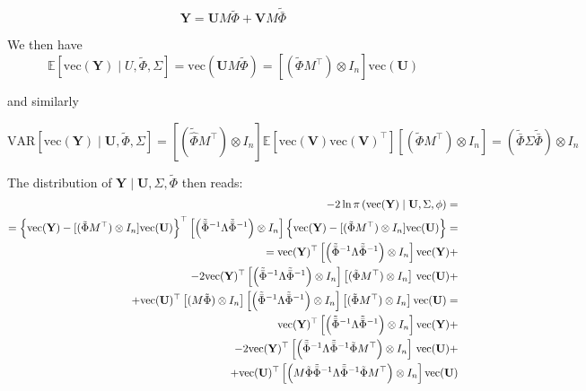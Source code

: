 \documentclass[
]{article}
\begin{document}
\begin{equation}
\label{eq:Mmod_conv}
\mathbf{Y} =     \mathbf{U}M\tilde{\Phi} + \mathbf{V}M \tilde{\bar{\Phi}}
\end{equation}

We then have \[
\mathbb{E} [\mathrm{vec}(\mathbf{Y}) \mid U, \tilde{\Phi}, \Sigma] = \mathrm{vec}(\mathbf{U} M \tilde{\Phi}) =
[(\tilde{\Phi} M^{\top}) \otimes I_n] \mathrm{vec}(\mathbf{U})
\]

and similarly

\[
\mathrm{VAR} [\mathrm{vec}(\mathbf{Y}) \mid \mathbf{U}, \tilde{\Phi}, \Sigma] =
\left[(\tilde{{\hat\Phi}} M^{\top}) \otimes I_n \right] 
\mathbb{E} \left[
\mathrm{vec}(\mathbf{V})
\mathrm{vec}(\mathbf{V})^\top \right]
\left[(\tilde{\Phi} M^{\top}) \otimes I_n \right] = 
\left(
\tilde{\bar{\Phi}} \Sigma \tilde{\bar{\Phi}}
\right) \otimes I_n
\]

The distribution of \(\mathbf{Y} \mid \mathbf{U}, \Sigma, \tilde{\Phi}\)
then reads: \begin{align*}
-2 \ln \pi \left(\mathrm{vec}(\mathbf{Y}) \mid \mathbf{U}, \Sigma, \phi \right) = \\= \Big{ \{ }
 \mathrm{vec}(\mathbf{Y}) - [(\tilde{\Phi} M^{\top}) \otimes I_n] \mathrm{vec}(\mathbf{U}) \Big{\} } ^{\top}
\left[ \left(
\tilde{\bar{\Phi}}^{-1} \Lambda \tilde{\bar{\Phi}}^{-1}
\right) \otimes I_n \right] 
\Big{ \{ } \mathrm{vec}(\mathbf{Y}) -[(\tilde{\Phi} M^{\top}) \otimes I_n] \mathrm{vec}(\mathbf{U}) \Big{\}} = \\ =
\mathrm{vec}(\mathbf{Y})^{\top}
\left[ \left(
\tilde{\bar{\Phi}}^{-1} \Lambda \tilde{\bar{\Phi}}^{-1}
\right) \otimes I_n \right] 
\mathrm{vec}(\mathbf{Y}) + \\ 
- 2\mathrm{vec}(\mathbf{Y})^{\top} 
\left[ \left(
\tilde{\bar{\Phi}}^{-1} \Lambda \tilde{\bar{\Phi}}^{-1} \right) \otimes I_n \right] 
\left[ (\tilde{\Phi} M^{\top}) \otimes I_n \right] \,\mathrm{vec}(\mathbf{U})   + \\
+  \mathrm{vec}(\mathbf{U})^{\top}
    \left[ (M \tilde{\Phi}) \otimes I_n \right]
    \left[ \left( \tilde{\bar{\Phi}}^{-1} \Lambda \tilde{\bar{\Phi}}^{-1} \right) \otimes I_n \right]
    \left[ (\tilde{\Phi} M^{\top}) \otimes I_n \right]
   \mathrm{vec}(\mathbf{U}) = \\
\mathrm{vec}(\mathbf{Y})^{\top}
\left[ \left(
\tilde{\bar{\Phi}}^{-1} \Lambda \tilde{\bar{\Phi}}^{-1}
\right) \otimes I_n \right] 
\mathrm{vec}(\mathbf{Y}) + \\ 
- 2\mathrm{vec}(\mathbf{Y})^{\top} 
\left[ \left( \tilde{\bar{\Phi}}^{-1} \Lambda \tilde{\bar{\Phi}}^{-1} \tilde{\Phi} M^{\top} \right)
\otimes I_n \right]  \,\mathrm{vec}(\mathbf{U})   + \\
+  \mathrm{vec}(\mathbf{U})^{\top}
    \left[ \left( M \tilde{\Phi}  \tilde{\bar{\Phi}}^{-1} \Lambda \tilde{\bar{\Phi}}^{-1}  \tilde{\Phi} M^{\top} \right) \otimes I_n \right]
   \mathrm{vec}(\mathbf{U})
\end{align*}
\end{document}

